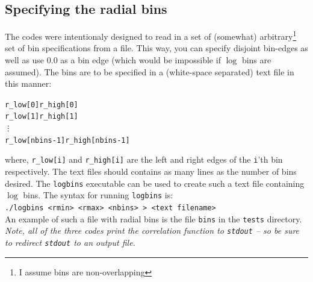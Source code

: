 \documentclass[12pt,titlepage,justified]{article}
\begin{document}
\subsection{Specifying the radial bins}\label{section:bins}
The codes were intentionaly designed to read in a set of (somewhat) arbitrary\footnote{I assume bins are non-overlapping} set of bin specifications from a file. This way, you can specify disjoint bin-edges as well as 
use $0.0$ as a bin edge (which would be impossible if $\log$ bins are assumed). The bins are to be specified in a (white-space separated) text file in this manner:
\begin{alltt}
r\_low[0]  r\_high[0]
r\_low[1]  r\_high[1]
\vdots
r\_low[nbins-1]  r\_high[nbins-1]
\end{alltt}
where, \texttt{r\_low[i]} and \texttt{r\_high[i]} are the left and right edges of the \texttt{i}'th bin respectively. The text files should contains as many lines as the number of 
bins desired. The \texttt{logbins} executable can be used to create such a text file containing $\log$ bins. The syntax for running \texttt{logbins} is:\\
\vspace{0.2in}
\texttt{./logbins <rmin> <rmax> <nbins>   > <text filename>}
\vspace{0.2in}
\\An example of such a file with radial bins is the file \texttt{bins} in the \texttt{tests} directory. 
{\em Note, all of the three codes print the correlation function to \texttt{stdout} -- so be sure to redirect \texttt{stdout} to an output file. }
\end{document}
